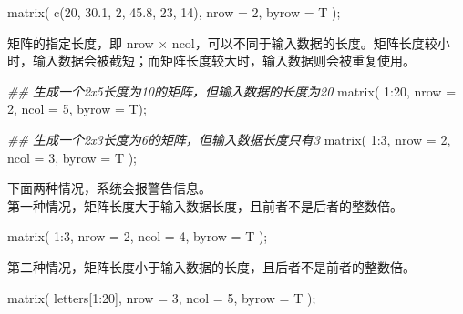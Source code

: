 \documentclass[
]{article}
\newenvironment{Shaded}{}{}
\newcommand{\AttributeTok}[1]{\textcolor[rgb]{0.49,0.56,0.16}{#1}}
\newcommand{\DecValTok}[1]{\textcolor[rgb]{0.25,0.63,0.44}{#1}}
\newcommand{\DocumentationTok}[1]{\textcolor[rgb]{0.73,0.13,0.13}{\textit{#1}}}
\newcommand{\FloatTok}[1]{\textcolor[rgb]{0.25,0.63,0.44}{#1}}
\newcommand{\FunctionTok}[1]{\textcolor[rgb]{0.02,0.16,0.49}{#1}}
\newcommand{\NormalTok}[1]{#1}
\newcommand{\SpecialCharTok}[1]{\textcolor[rgb]{0.25,0.44,0.63}{#1}}
\begin{document}
\begin{Shaded}
\begin{Highlighting}[]
\FunctionTok{matrix}\NormalTok{( }\FunctionTok{c}\NormalTok{(}\DecValTok{20}\NormalTok{, }\FloatTok{30.1}\NormalTok{, }\DecValTok{2}\NormalTok{, }\FloatTok{45.8}\NormalTok{, }\DecValTok{23}\NormalTok{, }\DecValTok{14}\NormalTok{), }\AttributeTok{nrow =} \DecValTok{2}\NormalTok{, }\AttributeTok{byrow =}\NormalTok{ T );}
\end{Highlighting}
\end{Shaded}

矩阵的指定长度，即 nrow ×
ncol，可以不同于输入数据的长度。矩阵长度较小时，输入数据会被截短；而矩阵长度较大时，输入数据则会被重复使用。

\begin{Shaded}
\begin{Highlighting}[]
\DocumentationTok{\#\# 生成一个2x5长度为10的矩阵，但输入数据的长度为20}
\FunctionTok{matrix}\NormalTok{( }\DecValTok{1}\SpecialCharTok{:}\DecValTok{20}\NormalTok{, }\AttributeTok{nrow =} \DecValTok{2}\NormalTok{, }\AttributeTok{ncol =} \DecValTok{5}\NormalTok{, }\AttributeTok{byrow =}\NormalTok{ T); }

\DocumentationTok{\#\# 生成一个2x3长度为6的矩阵，但输入数据长度只有3}
\FunctionTok{matrix}\NormalTok{( }\DecValTok{1}\SpecialCharTok{:}\DecValTok{3}\NormalTok{, }\AttributeTok{nrow =} \DecValTok{2}\NormalTok{, }\AttributeTok{ncol =} \DecValTok{3}\NormalTok{, }\AttributeTok{byrow =}\NormalTok{ T ); }
\end{Highlighting}
\end{Shaded}

下面两种情况，系统会报警告信息。\\
第一种情况，矩阵长度大于输入数据长度，且前者不是后者的整数倍。

\begin{Shaded}
\begin{Highlighting}[]
\FunctionTok{matrix}\NormalTok{( }\DecValTok{1}\SpecialCharTok{:}\DecValTok{3}\NormalTok{, }\AttributeTok{nrow =} \DecValTok{2}\NormalTok{, }\AttributeTok{ncol =} \DecValTok{4}\NormalTok{, }\AttributeTok{byrow =}\NormalTok{ T );}
\end{Highlighting}
\end{Shaded}

第二种情况，矩阵长度小于输入数据的长度，且后者不是前者的整数倍。

\begin{Shaded}
\begin{Highlighting}[]
\FunctionTok{matrix}\NormalTok{( letters[}\DecValTok{1}\SpecialCharTok{:}\DecValTok{20}\NormalTok{], }\AttributeTok{nrow =} \DecValTok{3}\NormalTok{, }\AttributeTok{ncol =} \DecValTok{5}\NormalTok{, }\AttributeTok{byrow =}\NormalTok{ T );}
\end{Highlighting}
\end{Shaded}
\end{document}
